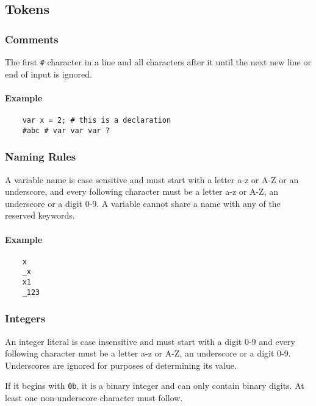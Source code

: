 \subsection{Tokens}

\subsubsection{Comments}

The first \verb|#| character in a line and all characters after it until the next new line or end of input is ignored.

\paragraph{Example}

\begin{verbatim}
    var x = 2; # this is a declaration
    #abc # var var var ?
\end{verbatim}

\subsubsection{Naming Rules}

A variable name is case sensitive and must start with a letter a-z or A-Z or an underscore, and every following character must be a letter a-z or A-Z, an underscore or a digit 0-9. A variable cannot share a name with any of the reserved keywords.

\paragraph{Example}

\begin{verbatim}
    x
    _x
    x1
    _123
\end{verbatim}

\subsubsection{Integers}

An integer literal is case insensitive and must start with a digit 0-9 and every following character must be a letter a-z or A-Z, an underscore or a digit 0-9. Underscores are ignored for purposes of determining its value.

If it begins with \verb|0b|, it is a binary integer and can only contain binary digits. At least one non-underscore character must follow.

